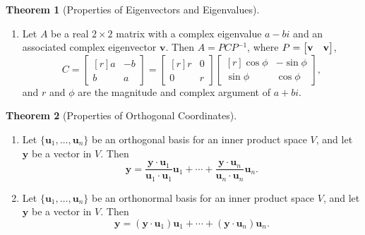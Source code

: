 \documentclass{myart}
\renewcommand{\vec}[1]{\ensuremath{\mathbf{#1}}} %
\newcommand{\mat}[1]{\ensuremath{#1}} %
\newcommand{\by}{\ensuremath{\times}} %
\newcommand{\MAT}[2][r]{\ensuremath{\begin{bmatrix*}[#1]#2\end{bmatrix*}}} %
\newcommand{\set}[1]{\ensuremath{\{#1\}}} %
\newcommand{\inv}{\ensuremath{^{-1}}} %
\newcommand{\many}[2][n]{\ensuremath{{#2}_1, \ldots, {#2}_{#1}}} %
\let\Re\relax
\DeclareMathOperator{\Re}{Re} %
\let\Im\relax
\DeclareMathOperator{\Im}{Im} %
\renewcommand{\dot}{\cdot} %
\theoremstyle{definition}
\newtheorem{thm}{Theorem}
\begin{document}
\begin{thm}[Properties of Eigenvectors and Eigenvalues]
\begin{enumerate}
\item Let \mat A be a real $2 \by 2$ matrix with a complex eigenvalue $a - bi$ and an associated complex eigenvector \vec v. Then $\mat A = \mat P\mat C\mat P\inv$, where $\mat P = \MAT{\Re \vec v & \Im \vec v}$,
\begin{equation*}
\mat C = \MAT{a & -b \\ b & a} = \MAT{r & 0 \\ 0 & r} \MAT{\cos \phi & -\sin \phi \\ \sin \phi & \cos \phi},
\end{equation*}
and $r$ and $\phi$ are the magnitude and complex argument of $a + bi$.
\end{enumerate}
\end{thm}

\begin{thm}[Properties of Orthogonal Coordinates] \hfill
\begin{enumerate}
\item Let \set{\many{\vec u}} be an orthogonal basis for an inner product space $V$, and let \vec y be a vector in $V$. Then
\begin{equation*}
\vec y = \frac{\vec y \dot \vec u_1}{\vec u_1 \dot \vec u_1} \vec u_1 + \cdots + \frac{\vec y \dot \vec u_n}{\vec u_n \dot \vec u_n} \vec u_n.
\end{equation*}
\item Let \set{\many{\vec u}} be an orthonormal basis for an inner product space $V$, and let \vec y be a vector in $V$. Then
\begin{equation*}
\vec y = (\vec y \dot \vec u_1) \vec u_1 + \cdots + (\vec y \dot \vec u_n) \vec u_n.
\end{equation*}
\end{enumerate}
\end{thm}
\end{document}
